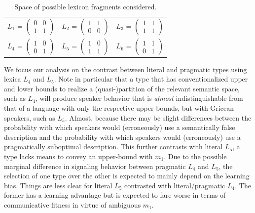 \documentclass[a4paper]{article}
\begin{document}
\begin{table}[t]
\centering 
\begin{tabular}{l c l}
$L_1$ = $\begin{pmatrix} 0 & 0 \\ 1 & 1 \end{pmatrix}$ & 
$L_2$ = $\begin{pmatrix} 1 & 1 \\ 0 & 0 \end{pmatrix}$ & 
$L_3$ = $\begin{pmatrix} 1 & 1 \\ 1 & 1 \end{pmatrix}$\\[0.5cm]

$L_4$ = $\begin{pmatrix} 1 & 0 \\ 0 & 1 \end{pmatrix}$ &
$L_5$ = $\begin{pmatrix} 1 & 0 \\ 1 & 1 \end{pmatrix}$ &
$L_6$ = $\begin{pmatrix} 1 & 1 \\ 0 & 1 \end{pmatrix}$
\end{tabular}
\caption{Space of possible lexicon fragments considered.}
\label{tab:lexica}
\end{table}

We focus our analysis on the contrast between literal and pragmatic types using lexica $L_4$ and $L_5$. Note in particular  that a type that has conventionalized upper and lower bounds to realize a (quasi-)partition of the relevant semantic space, such as $L_4$, will produce speaker behavior that is {\em almost} indistinguishable from that of a language with only the respective upper bounds, but with Gricean speakers, such as $L_5$. Almost, because there may be slight differences between the probability with which speakers would (erroneously) use a semantically false description and the probability with which speakers would (erroneously) use a pragmatically suboptimal description. This further contrasts with literal $L_5$, a type lacks means to convey an upper-bound with $m_1$. Due to the possible marginal difference in signaling behavior between pragmatic $L_4$ and $L_5$, the selection of one type over the other is expected to mainly depend on the learning bias. Things are less clear for literal $L_5$ contrasted with literal/pragmatic $L_4$. The former has a learning advantage but is expected to fare worse in terms of communicative fitness in virtue of ambiguous $m_1$.
\end{document}
